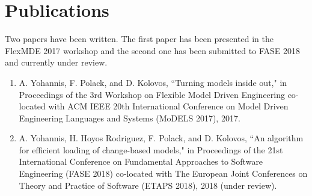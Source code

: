 \documentclass[12pt, a4paper]{report} \usepackage[titletoc]{appendix}
\begin{document}
\chapter{Publications}
\label{ch:publications}
Two papers have been written. The first paper \cite{yohannis2017turning} has been presented in the FlexMDE 2017 workshop and the second one \cite{yohannis2018algorithm} has been submitted to FASE 2018 and currently under review.
\begin{enumerate}
	\item A. Yohannis, F. Polack, and D. Kolovos, ``Turning models inside out," in Proceedings of the 3rd Workshop on Flexible Model Driven Engineering co-located with ACM IEEE 20th International Conference on Model Driven Engineering Languages and Systems (MoDELS 2017), 2017.
	\item  A. Yohannis, H. Hoyos Rodriguez, F. Polack, and D. Kolovos, ``An algorithm for efficient loading of change-based models," in Proceedings of the 21st International Conference on Fundamental Approaches to Software Engineering (FASE 2018) co-located with The European Joint Conferences on Theory and Practice of Software (ETAPS 2018), 2018 (under review).
\end{enumerate}







\end{document}
